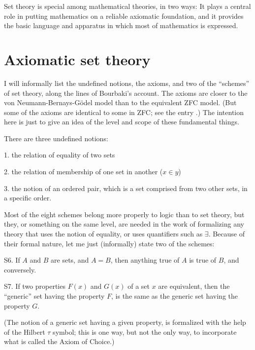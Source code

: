 \documentclass[12pt]{article}
\begin{document}
Set theory is special among mathematical theories, in two ways: It plays
a central role in putting mathematics on a reliable axiomatic foundation,
and it provides the basic language and apparatus in which most of
mathematics is expressed.

\section{Axiomatic set theory}
I will informally list the undefined notions, the axioms, and two of the
``schemes'' of set theory, along the lines of Bourbaki's account. The
axioms are closer to the von Neumann-Bernays-G\"{o}del model than to the
equivalent ZFC model. (But some of the axioms are identical to some in ZFC;
see the entry .) The intention here is just to
give an idea of the level and scope of these fundamental things.

There are three undefined notions:

1. the relation of equality of two sets

2. the relation of membership of one set in another ($x\in y$)

3. the notion of an ordered pair, which is a set comprised from two other
sets, in a specific order.

Most of the eight schemes belong more properly to logic than to
set theory, but they, or something on the same level, are
needed in the work of formalizing any theory that uses the notion of
equality, or uses quantifiers such as $\exists$.
Because of their formal nature, let me just (informally)
state two of the schemes:

S6. If $A$ and $B$ are sets, and $A=B$, then anything true of $A$ is true of
$B$, and conversely.

S7. If two properties $F(x)$ and $G(x)$ of a set $x$ are equivalent,
then the ``generic'' set having the property $F$, is the same as the
generic set having the property $G$.

(The notion of a generic set having a given property, is formalized
with the help of the Hilbert $\tau$ symbol; this is one way,
but not the only way, to incorporate what is called the Axiom of Choice.)
\end{document}
